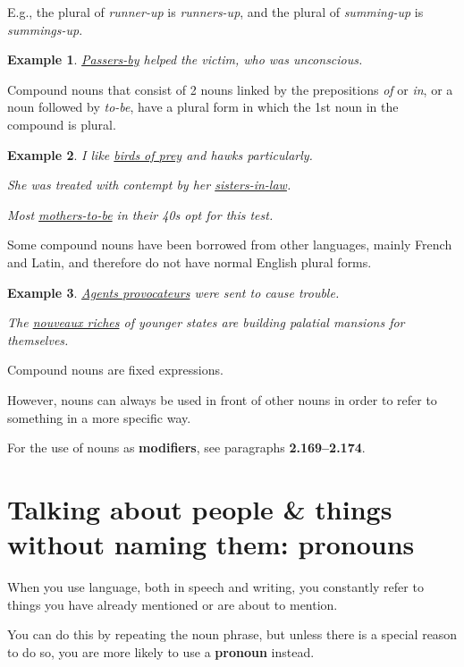 \documentclass[oneside]{book}
\numberwithin{equation}{section}
\newtheorem{example}{Example}[section]
\begin{document}
%
E.g., the plural of \textit{runner-up} is \textit{runners-up}, and the plural of \textit{summing-up} is \textit{summings-up}.
\begin{example}
    \underline{Passers-by} helped the victim, who was unconscious.
\end{example}
Compound nouns that consist of 2 nouns linked by the prepositions \textit{of} or \textit{in}, or a noun followed by \textit{to-be}, have a plural form in which the 1st noun in the compound is plural.
\begin{example}
    I like \underline{birds of prey} and hawks particularly.
    
    She was treated with contempt by her \underline{sisters-in-law}.
    
    Most \underline{mothers-to-be} in their 40s opt for this test.
\end{example}
Some compound nouns have been borrowed from other languages, mainly French and Latin, and therefore do not have normal English plural forms.
\begin{example}
    \underline{Agents provocateurs} were sent to cause trouble.
    
    The \underline{nouveaux riches} of younger states are building palatial mansions for themselves.
\end{example}
%
\noindent{} Compound nouns are fixed expressions.

However, nouns can always be used in front of other nouns in order to refer to something in a more specific way.

For the use of nouns as \textbf{modifiers}, see paragraphs \textbf{2.169--2.174}.

\section{Talking about people \& things without naming them: pronouns}
\noindent{} When you use language, both in speech and writing, you constantly refer to things you have already mentioned or are about to mention.

%
You can do this by repeating the noun phrase, but unless there is a special reason to do so, you are more likely to use a \textbf{pronoun} instead.
\end{document}
